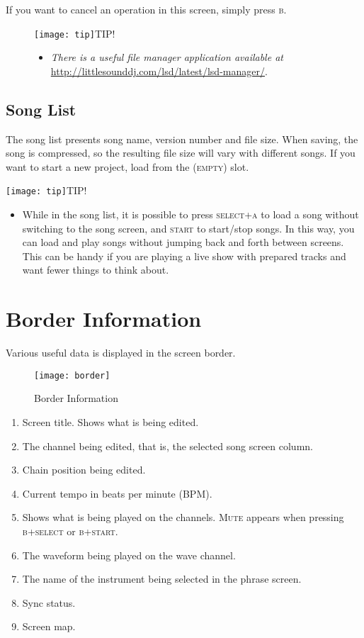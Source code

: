 If you want to cancel an operation in this screen, simply press \textsc{b}.

\begin{figure}[hbtp]
\texttt{[image: tip]}TIP!
\begin{itemize}
        \item \textit{There is a useful file manager application available at} \url{http://littlesounddj.com/lsd/latest/lsd-manager/}.
	\end{itemize}
\end{figure}

\subsection{Song List}

The song list presents song name, version number and file size. When saving, the song is compressed, so the resulting file size will vary with different songs. If you want to start a new project, load from the \textsc{(empty)} slot.

\texttt{[image: tip]}TIP!
\begin{itemize}
    \item{While in the song list, it is possible to press \textsc{select+a} to load a song without switching to the song screen, and \textsc{start} to start/stop songs. In this way, you can load and play songs without jumping back and forth between screens. This can be handy if you are playing a live show with prepared tracks and want fewer things to think about.}
\end{itemize}

\section{Border Information}

Various useful data is displayed in the screen border.

\begin{figure}[htpb]
	\begin{center}
	\texttt{[image: border]}
	\end{center}
	\caption{Border Information}
	\label{fig:border}
\end{figure}

\begin{enumerate}
\item Screen title. Shows what is being edited.
\item The channel being edited, that is, the selected song screen column.
\item Chain position being edited.
\item Current tempo in beats per minute (BPM).
\item Shows what is being played on the channels. \textsc{Mute} appears when pressing \textsc{b+select} or \textsc{b+start}.
\item The waveform being played on the wave channel.
\item The name of the instrument being selected in the phrase screen.
\item Sync status.
\item Screen map.
\end{enumerate}


